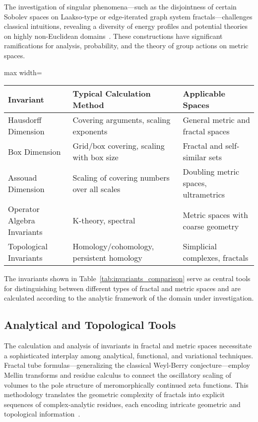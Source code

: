 \documentclass[sigconf]{acmart}
\begin{document}
The investigation of singular phenomena—such as the disjointness of certain Sobolev spaces on Laakso-type or edge-iterated graph system fractals—challenges classical intuitions, revealing a diversity of energy profiles and potential theories on highly non-Euclidean domains~\cite{ref30,ref35}. These constructions have significant ramifications for analysis, probability, and the theory of group actions on metric spaces.

\begin{table*}[htbp]
\centering
\caption{Key Invariants Across Metric Spaces and Their Calculation Methods}
\label{tab:invariants_comparison}
\begin{adjustbox}{max width=\textwidth}
\begin{tabular}{lll}
\toprule
\textbf{Invariant} & \textbf{Typical Calculation Method} & \textbf{Applicable Spaces} \\
\midrule
Hausdorff Dimension & Covering arguments, scaling exponents & General metric and fractal spaces \\
Box Dimension & Grid/box covering, scaling with box size & Fractal and self-similar sets \\
Assouad Dimension & Scaling of covering numbers over all scales & Doubling metric spaces, ultrametrics \\
Operator Algebra Invariants & K-theory, spectral & Metric spaces with coarse geometry \\
Topological Invariants & Homology/cohomology, persistent homology & Simplicial complexes, fractals \\
\bottomrule
\end{tabular}
\end{adjustbox}
\end{table*}

The invariants shown in Table~\ref{tab:invariants_comparison} serve as central tools for distinguishing between different types of fractal and metric spaces and are calculated according to the analytic framework of the domain under investigation.

\subsection{Analytical and Topological Tools}

The calculation and analysis of invariants in fractal and metric spaces necessitate a sophisticated interplay among analytical, functional, and variational techniques. Fractal tube formulas—generalizing the classical Weyl-Berry conjecture—employ Mellin transforms and residue calculus to connect the oscillatory scaling of volumes to the pole structure of meromorphically continued zeta functions. This methodology translates the geometric complexity of fractals into explicit sequences of complex-analytic residues, each encoding intricate geometric and topological information~\cite{ref21,ref33}.
\end{document}
